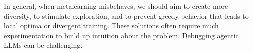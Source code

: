In general, when metalearning misbehaves, we should aim to create more diversity, to stimulate exploration, and to prevent greedy behavior that leads to local optima or divergent training. 
These solutions often require much experimentation to build up intuition about the problem. Debugging agentic LLMs can be challenging.

